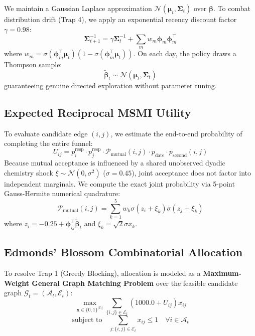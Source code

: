 \documentclass[10pt,twocolumn,letterpaper]{article}
\begin{document}
We maintain a Gaussian Laplace approximation $\mathcal{N}(\boldsymbol{\mu}_t, \boldsymbol{\Sigma}_t)$ over $\boldsymbol{\beta}$. To combat distribution drift (Trap 4), we apply an exponential recency discount factor $\gamma = 0.98$:
\begin{equation}
\boldsymbol{\Sigma}_{t+1}^{-1} = \gamma \boldsymbol{\Sigma}_t^{-1} + \sum_m w_m \boldsymbol{\phi}_m \boldsymbol{\phi}_m^\top
\end{equation}
where $w_m = \sigma(\boldsymbol{\phi}_m^\top \boldsymbol{\mu}_t)(1 - \sigma(\boldsymbol{\phi}_m^\top \boldsymbol{\mu}_t))$. On each day, the policy draws a Thompson sample:
\begin{equation}
\tilde{\boldsymbol{\beta}}_t \sim \mathcal{N}(\boldsymbol{\mu}_t, \boldsymbol{\Sigma}_t)
\end{equation}
guaranteeing genuine directed exploration without parameter tuning.

\subsection{Expected Reciprocal MSMI Utility}
To evaluate candidate edge $(i, j)$, we estimate the end-to-end probability of completing the entire funnel:
\begin{equation}
U_{ij} = p_i^{\text{resp}} \cdot p_j^{\text{resp}} \cdot \mathcal{P}_{\text{mutual}}(i, j) \cdot p_{\text{date}} \cdot p_{\text{second}}(i, j)
\end{equation}
Because mutual acceptance is influenced by a shared unobserved dyadic chemistry shock $\xi \sim \mathcal{N}(0, \sigma^2)$ ($\sigma = 0.45$), joint acceptance does not factor into independent marginals. We compute the exact joint probability via 5-point Gauss-Hermite numerical quadrature:
\begin{equation}
\mathcal{P}_{\text{mutual}}(i, j) = \sum_{k=1}^5 w_k \sigma\left(z_i + \xi_k\right) \sigma\left(z_j + \xi_k\right)
\end{equation}
where $z_i = -0.25 + \boldsymbol{\phi}_{ij}^\top \tilde{\boldsymbol{\beta}}_t$ and $\xi_k = \sqrt{2}\sigma x_k$.

\subsection{Edmonds' Blossom Combinatorial Allocation}
To resolve Trap 1 (Greedy Blocking), allocation is modeled as a \textbf{Maximum-Weight General Graph Matching Problem} over the feasible candidate graph $\mathcal{G}_t = (\mathcal{A}_t, \mathcal{E}_t)$:
\begin{equation}
\label{eq:blossom_ip}
\max_{\boldsymbol{x} \in \{0, 1\}^{|\mathcal{E}_t|}} \sum_{\{i, j\} \in \mathcal{E}_t} \left(1000.0 + U_{ij}\right) x_{ij}
\end{equation}
\begin{equation}
\text{subject to} \quad \sum_{j : \{i, j\} \in \mathcal{E}_t} x_{ij} \le 1 \quad \forall i \in \mathcal{A}_t
\end{equation}
\end{document}
